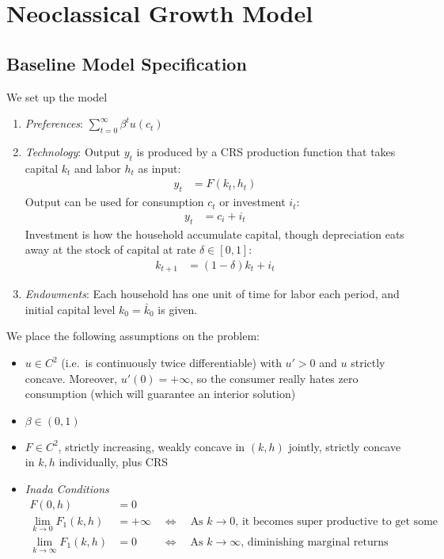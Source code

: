 \documentclass[12pt]{article}
\theoremstyle{plain}
\theoremstyle{definition}
\theoremstyle{remark}
\newcommand{\ra}{\rightarrow}
\newcommand{\sumtinfz}{\sum^\infty_{t=0}}
\begin{document}
\clearpage

\section{Neoclassical Growth Model}

\subsection{Baseline Model Specification}
We set up the model
\begin{enumerate}
  \item \emph{Preferences}: $\sumtinfz \beta^t u(c_t)$

  \item \emph{Technology}: Output $y_t$ is produced by a CRS production
    function that takes capital $k_t$ and labor $h_t$ as input:
    \begin{align*}
      y_t &= F(k_t,h_t)
    \end{align*}
    Output can be used for consumption $c_t$ or investment $i_t$:
    \begin{align*}
      y_t &= c_i + i_t
    \end{align*}
    Investment is how the household accumulate capital, though
    depreciation eats away at the stock of capital at rate
    $\delta\in[0,1]$:
    \begin{align*}
      k_{t+1} &= (1-\delta)k_t + i_t
    \end{align*}

  \item \emph{Endowments}: Each household has one unit of time for labor
    each period, and initial capital level $k_0=\bar{k}_0$ is given.
\end{enumerate}
We place the following assumptions on the problem:
\begin{itemize}
  \item $u \in C^2$ (i.e.\ is continuously twice differentiable) with
    $u' > 0$ and $u$ strictly concave. Moreover, $u'(0)=+\infty$, so the
    consumer really hates zero consumption (which will guarantee an
    interior solution)
  \item $\beta\in(0,1)$
  \item $F\in C^2$, strictly increasing, weakly concave in $(k,h)$
    jointly, strictly concave in $k,h$ individually, plus CRS
  \item \emph{Inada Conditions}
    \begin{align*}
      F(0,h) &= 0 \\
      \lim_{k\ra 0} F_1(k,h) &= +\infty
      \quad\iff \quad\text{As $k\ra 0$, it becomes super productive to get some} \\
      \lim_{k\ra \infty} F_1(k,h) &= 0
      \;\qquad\iff\quad\text{As $k\ra \infty$, diminishing marginal returns}
    \end{align*}
\end{itemize}
\end{document}
